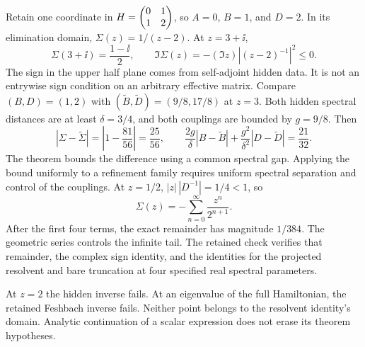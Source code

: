 Retain one coordinate in $H=\begin{pmatrix}0&1\\1&2\end{pmatrix}$, so $A=0$, $B=1$, and $D=2$. In its elimination domain, $\Sigma(z)=1/(z-2)$. At $z=3+\ii$,
\[
\Sigma(3+\ii)=\frac{1-\ii}{2},\qquad
\Im\Sigma(z)=-(\Im z)\left|(z-2)^{-1}\right|^2\leq0.
\]
The sign in the upper half plane comes from self-adjoint hidden data. It is not an entrywise sign condition on an arbitrary effective matrix.
Compare $(B,D)=(1,2)$ with $(\widetilde B,\widetilde D)=(9/8,17/8)$ at $z=3$. Both hidden spectral distances are at least $\delta=3/4$, and both couplings are bounded by $g=9/8$. Then
\[
|\Sigma-\widetilde\Sigma|=\left|1-\frac{81}{56}\right|=\frac{25}{56},
\qquad
\frac{2g}{\delta}|B-\widetilde B|
+\frac{g^2}{\delta^2}|D-\widetilde D|=\frac{21}{32}.
\]
The theorem bounds the difference using a common spectral gap. Applying the bound uniformly to a refinement family requires uniform spectral separation and control of the couplings.
At $z=1/2$, $|z|\,|D^{-1}|=1/4<1$, so
\[
\Sigma(z)=-\sum_{n=0}^{\infty}\frac{z^n}{2^{n+1}}.
\]
After the first four terms, the exact remainder has magnitude $1/384$. The geometric series controls the infinite tail. The retained check verifies that remainder, the complex sign identity, and the identities for the projected resolvent and bare truncation at four specified real spectral parameters.

At $z=2$ the hidden inverse fails. At an eigenvalue of the full Hamiltonian, the retained Feshbach inverse fails. Neither point belongs to the resolvent identity's domain. Analytic continuation of a scalar expression does not erase its theorem hypotheses.

